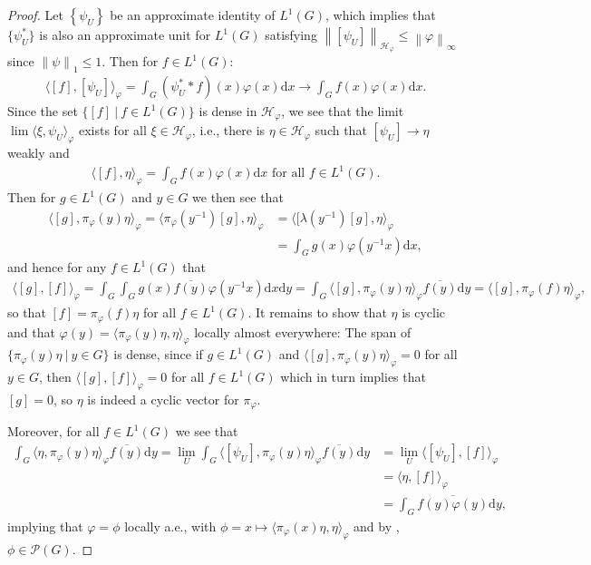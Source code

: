 \documentclass[10pt,twoside,openany,final]{memoir}
\theoremstyle{definition}
\theoremstyle{Break}
\newcommand{\lv}{\left\lVert}
\newcommand{\rv}{\right\rVert}
\renewcommand{\H}{\mathcal{H}}
\renewcommand{\d}{\mathrm{d}}
\begin{document}
\begin{proof}
	Let $\left\{ \psi_U \right\}$ be an approximate identity of $L^1(G)$, which implies that $\{\psi_U^*\}$ is also an approximate unit for $L^1(G)$ satisfying $\lv [\psi_U]\rv_{\H_\varphi}\leq \lv \varphi \rv_\infty$ since $\lv \psi\rv_1 \leq 1$. Then for $f \in L^1(G)$:
	\begin{align*}
		\langle [f] , [\psi_U]\rangle_\varphi=\int_G (\psi_U^* \ast f)(x) \varphi(x) \d x \to \int_G f(x) \varphi(x) \d x.
	\end{align*}
	Since the set $\{[f] \ | \ f \in L^1(G)\}$ is dense in $\H_\varphi$, we see that the limit $\lim \langle \xi , \psi_U\rangle_\varphi$ exists for all $\xi \in \H_\varphi$, i.e., there is $\eta \in \H_\varphi$ such that $[\psi_U]\to \eta$ weakly and
	\begin{align*}
		\langle [f], \eta \rangle_\varphi=\int_G f(x) \varphi(x) \d x \text{ for all } f \in L^1(G).
	\end{align*}
	Then for $g \in L^1(G)$ and $y \in G$ we then see that
\begin{align*}
	\langle [g] , \pi_\varphi(y) \eta \rangle_ \varphi = \langle \pi_\varphi(y^{-1}) [g], \eta \rangle_\varphi &= \langle [\lambda(y^{-1})[g] , \eta \rangle_\varphi\\
	&= \int_G g(x) \varphi(y^{-1}x) \d x,
\end{align*}
and hence for any $f \in L^1(G)$ that
\begin{align*}
	\langle [g],[f] \rangle_\varphi =\int_G \int_G g(x) \overline{f(y)} \varphi(y^{-1}x) \d x \d y = \int_G \langle [g], \pi_\varphi(y) \eta \rangle_\varphi \overline{f(y)} \d y = \langle [g] ,\pi_\varphi(f)\eta \rangle_\varphi,
\end{align*}
so that $[f]=\pi_\varphi(f) \eta$ for all $f \in L^1(G)$. It remains to show that $\eta$ is cyclic and that $\varphi(y)=\langle \pi_\varphi (y) \eta,\eta\rangle_\varphi$ locally almost everywhere: The span of $\{ \pi_\varphi(y) \eta \ | \ y \in G\}$ is dense, since if $g \in L^1(G)$ and $\langle [g] , \pi_\varphi(y) \eta \rangle_\varphi=0$ for all $y \in G$, then $\langle [g] , [f] \rangle_\varphi=0$ for all $f \in L^1(G)$ which in turn implies that $[g]=0$, so $\eta$ is indeed a cyclic vector for $\pi_\varphi$.

Moreover, for all $f \in L^1(G)$ we see that
\begin{align*}
	\int_G \langle \eta , \pi_\varphi(y) \eta \rangle_\varphi \overline{f(y)} \d y =\lim_U \int_G \langle [\psi_U] , \pi_\varphi(y) \eta \rangle_\varphi \overline{f(y)} \d y &= \lim_U  \langle [\psi_U] , [f] \rangle_\varphi\\
	&= \langle \eta,[f] \rangle_\varphi 
	\\&= \int_G \overline{f(y) \varphi(y) } \d y,
\end{align*}
implying that $\varphi=\phi$ locally a.e., with $\phi=x \mapsto \langle \pi_\varphi(x) \eta, \eta \rangle_\varphi$ and by , $\phi \in \mathcal{P}(G)$.
\end{proof}
\end{document}

